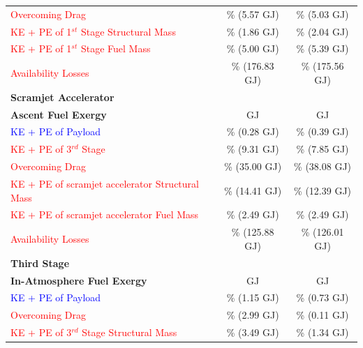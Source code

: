 \begin{table}[!ht]
\begin{tabular}{l c c}
 		\textcolor{red}{Overcoming Drag} 
 		& \WDoneConstqNoReturn \% (5.57 GJ) & \WDoneStandardNoReturn \% (5.03 GJ)
 		\\
 		\textcolor{red}{KE + PE of 1$^{st}$ Stage Structural Mass} 
 		& \WoneConstqNoReturn \% (1.86 GJ) & \WoneStandardNoReturn \% (2.04 GJ)
 		\\ 
 		\textcolor{red}{KE + PE of 1$^{st}$ Stage Fuel Mass} 
 		& \WmFoneConstqNoReturn \% (5.00 GJ) & \WmFoneStandardNoReturn \% (5.39 GJ)
 		\\ 
 		\textcolor{red}{Availability Losses}  
 		& \PlossoneConstqNoReturn \% (176.83 GJ) & \PlossoneStandardNoReturn \% (175.56 GJ)
 		\\ 
 		\textbf{Scramjet Accelerator}& & \\
 		\textbf{Ascent Fuel Exergy} 
 		& \textbf{\secondEnergyConstqNoReturn} GJ & \textbf{\secondEnergyStandardNoReturn} GJ
 		\\
 		\textcolor{blue}{KE + PE of Payload}
 		& \secondWpayloadConstqNoReturn \% (0.28 GJ) & \secondWpayloadStandardNoReturn \% (0.39 GJ) 
 		\\
 		\textcolor{red}{KE + PE of 3$^{rd}$ Stage}
 		& \secondWnextStageConstqNoReturn \% (9.31 GJ) & \secondWnextStageStandardNoReturn \% (7.85 GJ)
 		\\
 		\textcolor{red}{Overcoming Drag}
 		& \WDsecondConstqNoReturn \% (35.00 GJ) & \WDsecondStandardNoReturn \% (38.08 GJ)
 		\\
 		\textcolor{red}{KE + PE of scramjet accelerator Structural Mass}  
 		& \WsecondConstqNoReturn \% (14.41 GJ) & \WsecondStandardNoReturn \% (12.39 GJ)
 		\\
 		\textcolor{red}{KE + PE of scramjet accelerator Fuel Mass}  
 		& \WmFsecondConstqNoReturn \% (2.49 GJ) & \WmFsecondStandardNoReturn \% (2.49 GJ)
 		\\
 		\textcolor{red}{Availability Losses}  
 		& \PlosssecondConstqNoReturn \% (125.88 GJ) & \PlosssecondStandardNoReturn \% (126.01 GJ)
 		\\
 		
 		\textbf{Third Stage}& & \\
 		\textbf{In-Atmosphere Fuel Exergy} 
 		& \textbf{\thirdEnergyConstqNoReturn}  GJ & \textbf{\thirdEnergyStandardNoReturn}  GJ
 		\\
 		\textcolor{blue}{KE + PE of Payload}  
 		&\thirddExergyEffAtmConstqNoReturn \% (1.15 GJ) &\thirddExergyEffAtmStandardNoReturn \% (0.73 GJ)
 		\\
 		\textcolor{red}{Overcoming Drag}  
 		& \WDthreeConstqNoReturn \% (2.99 GJ) & \WDthreeStandardNoReturn \% (0.11 GJ)
 		\\
 		\textcolor{red}{KE + PE  of 3$^{rd}$ Stage Structural Mass}  
 		& \WthreeConstqNoReturn \% (3.49 GJ) & \WthreeStandardNoReturn \% (1.34 GJ)
 		\\
 		

\end{tabular}
\end{table}
